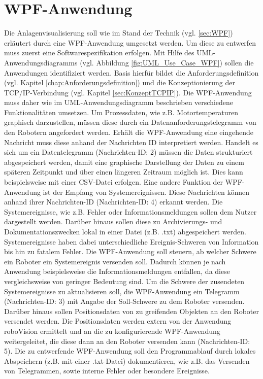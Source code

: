 \documentclass[ a4paper,
                oneside,
                toc=bibliography,
                toc=listof
                ]{scrbook}
\begin{document}
	\section{WPF-Anwendung}
	\label{sec:KonzeptWPF}
	Die Anlagenvisualisierung soll wie im Stand der Technik (vgl. \ref{sec:WPF}) erläutert durch eine WPF-Anwendung umgesetzt werden. Um diese zu entwerfen muss zuerst eine Softwarespezifikation erfolgen. Mit Hilfe des UML-Anwendungsdiagramms (vgl. Abbildung \ref{fig:UML_Use_Case_WPF}) sollen die Anwendungen identifiziert werden. Basis hierfür bildet die Anforderungsdefinition (vgl. Kapitel \ref{chap:Anforderungsdefinition}) und die Konzeptionierung der TCP/IP-Verbindung (vgl. Kapitel \ref{sec:KonzeptTCPIP}). Die WPF-Anwendung muss daher wie im UML-Anwendungsdiagramm beschrieben verschiedene Funktionalitäten umsetzen. Um Prozessdaten, wie z.B. Motortemperaturen graphisch darzustellen, müssen diese durch ein Datenanforderungstelegramm von den Robotern angefordert werden. Erhält die WPF-Anwendung eine eingehende Nachricht muss diese anhand der Nachrichten ID interpretiert werden. Handelt es sich um ein Datentelegramm (Nachrichten-ID: 2) müssen die Daten strukturiert abgespeichert werden, damit eine graphische Darstellung der Daten zu einem späteren Zeitpunkt und über einen längeren Zeitraum möglich ist. Dies kann beispielsweise mit einer CSV-Datei erfolgen. Eine andere Funktion der WPF-Anwendung ist der Empfang von Systemereignissen. Diese Nachrichten können anhand ihrer Nachrichten-ID (Nachrichten-ID: 4) erkannt werden. Die Systemereignisse, wie z.B. Fehler oder Informationsmeldungen sollen dem Nutzer dargestellt werden. Darüber hinaus sollen diese zu Archivierungs- und Dokumentationszwecken lokal in einer Datei (z.B. .txt) abgespeichert werden. Systemereignisse haben dabei unterschiedliche Ereignis-Schweren von Information bis hin zu fatalem Fehler. Die WPF-Anwendung soll steuern, ab welcher Schwere ein Roboter ein Systemereignis versenden soll. Dadurch können je nach Anwendung beispielsweise die Informationsmeldungen entfallen, da diese vergleichsweise von geringer Bedeutung sind. Um die Schwere der zusendeten Systemereignisse zu aktualisieren soll, die WPF-Anwendung ein Telegramm (Nachrichten-ID: 3) mit Angabe der Soll-Schwere zu dem Roboter versenden. Darüber hinaus sollen Positionsdaten von zu greifenden Objekten an den Roboter versendet werden. Die Positionsdaten werden extern von der Anwendung \glqq roboVision\grqq{} ermittelt und an die zu konfigurierende WPF-Anwendung weitergeleitet, die diese dann an den Roboter versenden kann (Nachrichten-ID: 5). Die zu entwerfende WPF-Anwendung soll den Programmablauf durch lokales Abspeichern (z.B. mit einer .txt-Datei) dokumentieren, wie z.B. das Versenden von Telegrammen, sowie interne Fehler oder besondere Ereignisse.\clearpage
	
\end{document}

